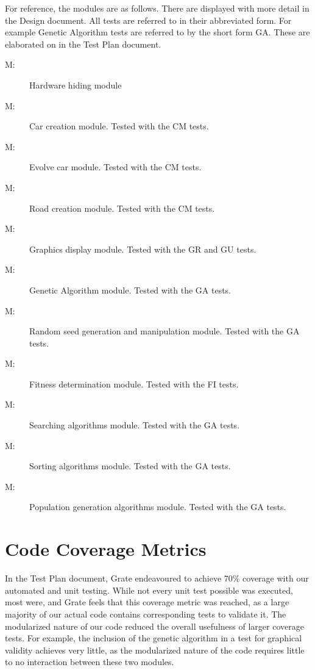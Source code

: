 \documentclass[12pt, titlepage]{article}
\newcounter{mnum}
\newcommand{\mthemnum}{M\themnum}
\begin{document}
For reference, the modules are as follows. There are displayed with more detail 
in the Design document. All tests are referred to in their abbreviated form. For 
example Genetic Algorithm tests are referred to by the short form GA. These are 
elaborated on in the Test Plan document.

\begin{description}
\item [ \mthemnum \label{mHardware}:] Hardware hiding 
module
\item [ \mthemnum \label{mCreateCar}:]  Car creation 
module. Tested with the CM tests.
\item [ \mthemnum \label{mEvolveCar}:] Evolve car module. 
Tested with the CM tests.
\item [ \mthemnum \label{mCreateRoad}:] Road creation 
module. Tested with the CM tests.
\item [ \mthemnum \label{mGraphicsDisplay}:] Graphics 
display module. Tested with the GR and GU tests.
\item [ \mthemnum \label{mGeneticAlgorithm}:] Genetic 
Algorithm module. Tested with the GA tests.
\item [ \mthemnum \label{mRandomSeed}:] Random seed 
generation and manipulation module. Tested with the GA tests.
\item [ \mthemnum \label{mFitness}:] Fitness determination 
module. Tested with the FI tests.
\item [ \mthemnum \label{mSearching}:] Searching algorithms 
module. Tested with the GA tests.
\item [ \mthemnum \label{mSorting}:] Sorting algorithms 
module. Tested with the GA tests.
\item [ \mthemnum \label{mPopulationGeneration}:] 
Population generation algorithms module. Tested with the GA tests.
\end{description}


\section{Code Coverage Metrics}

In the Test Plan document, Grate endeavoured to achieve 70\% coverage with our 
automated and unit testing. While not every unit test possible was executed, 
most were, and Grate feels that this coverage metric was reached, as a large 
majority of our actual code contains corresponding tests to validate it. The 
modularized nature of our code reduced the overall usefulness of larger coverage 
tests. For example, the inclusion of the genetic algorithm in a test for 
graphical validity achieves very little, as the modularized nature of the code 
requires little to no interaction between these two modules.
\end{document}
